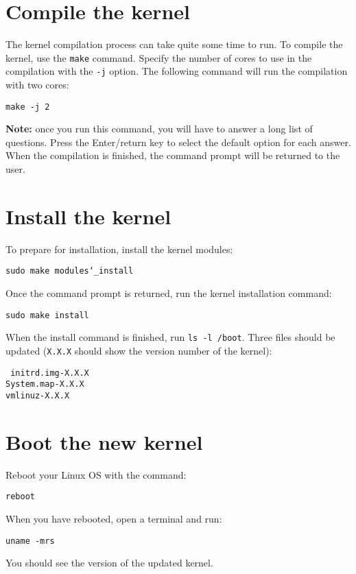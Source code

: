 \documentclass[12pt,a4paper]{report}
\begin{document}
\section{Compile the kernel}
The kernel compilation process can take quite some time to run. To compile the kernel, use the \texttt{make} command. Specify the number of cores to use in the compilation with the \texttt{-j} option. The following command will run the compilation with two cores:
\newline
\newline
\centerline{\texttt{make -j 2}}
\newline
\newline 
\textbf{Note:} once you run this command, you will have to answer a long list of questions. Press the Enter/return key to select the default option for each answer. When the compilation is finished, the command prompt will be returned to the user.

\section{Install the kernel}
To prepare for installation, install the kernel modules:
\newline
\newline
\centerline{\texttt{sudo make modules\char`_install}}
\newline
\newline 
Once the command prompt is returned, run the kernel installation command:
\newline
\newline
\centerline{\texttt{sudo make install}}
\newline
\newline 
When the install command is finished, run \texttt{ls -l /boot}. Three files should be updated (\texttt{X.X.X} should show the version number of the kernel):
\newline
\newline
\centerline{\texttt{
initrd.img-X.X.X
\\
System.map-X.X.X
\\
vmlinuz-X.X.X
}}
\section{Boot the new kernel}
Reboot your Linux OS with the command:
\newline
\newline
\centerline{\texttt{reboot}}
\newline
\newline 
When you have rebooted, open a terminal and run:
\newline
\newline
\centerline{\texttt{uname -mrs}}
\newline
\newline 
You should see the version of the updated kernel.
\end{document}
